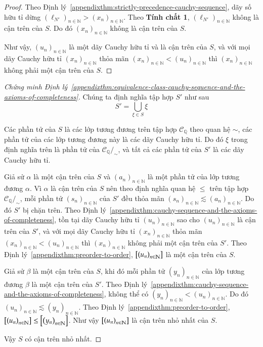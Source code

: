 \begin{proof}
    Theo Định lý~\ref{appendixthm:strictly-precedence-cauchy-sequence}, dãy số hữu tỉ dừng ${(\ell_{N'})}_{n\in\mathbb{N}} > {(x_{n})}_{n\in\mathbb{N}}$. Theo \textbf{Tính chất 1}, ${(\ell_{N'})}_{n\in\mathbb{N}}$ không là cận trên của $S$. Do đó ${(x_{n})}_{n\in\mathbb{N}}$ không là cận trên của $S$.

    Như vậy, ${(u_{n})}_{n\in\mathbb{N}}$ là một dãy Cauchy hữu tỉ và là cận trên của $S$, và với mọi dãy Cauchy hữu tỉ ${(x_{n})}_{n\in\mathbb{N}}$ thỏa mãn ${(x_{n})}_{n\in\mathbb{N}} < {(u_{n})}_{n\in\mathbb{N}}$ thì ${(x_{n})}_{n\in\mathbb{N}}$ không phải một cận trên của $S$.
\end{proof}

\begin{proof}[Chứng minh Định lý~\ref{appendixthm:equivalence-class-cauchy-sequence-and-the-axioms-of-completeness}]
    Chúng ta định nghĩa tập hợp $S'$ như sau
    \[
        S' = \bigcup_{\xi\in S} \xi
    \]

    Các phần tử của $S$ là các lớp tương đương trên tập hợp $\mathscr{C}_{\mathbb{Q}}$ theo quan hệ $\sim$, các phần tử của các lớp tương đương này là các dãy Cauchy hữu tỉ. Do đó $\xi$ trong định nghĩa trên là phần tử của $\mathscr{C}_{\mathbb{Q}}/_{\sim}$, và tất cả các phần tử của $S'$ là các dãy Cauchy hữu tỉ.

    Giả sử $\alpha$ là một cận trên của $S$ và ${(a_{n})}_{n\in\mathbb{N}}$ là một phần tử của lớp tương đương $\alpha$. Vì $\alpha$ là cận trên của $S$ nên theo định nghĩa quan hệ $\leq$ trên tập hợp $\mathscr{C}_{\mathbb{Q}}/_{\sim}$, mỗi phần tử ${(s_{n})}_{n\in\mathbb{N}}$ của $S'$ đều thỏa mãn ${(s_{n})}_{n\in\mathbb{N}}\lesssim {(a_{n})}_{n\in\mathbb{N}}$. Do đó $S'$ bị chặn trên. Theo Định lý~\ref{appendixthm:cauchy-sequence-and-the-axioms-of-completeness}, tồn tại dãy Cauchy hữu tỉ ${(u_{n})}_{n\in\mathbb{N}}$ sao cho ${(u_{n})}_{n\in\mathbb{N}}$ là cận trên của $S'$, và với mọi dãy Cauchy hữu tỉ ${(x_{n})}_{n\in\mathbb{N}}$ thỏa mãn ${(x_{n})}_{n\in\mathbb{N}} < {(u_{n})}_{n\in\mathbb{N}}$ thì ${(x_{n})}_{n\in\mathbb{N}}$ không phải một cận trên của $S'$. Theo Định lý~\ref{appendixthm:preorder-to-order}, $\left[{\left({u_{n}}\right)}_{{n}\in\mathbb{N}}\right]$ là một cận trên của $S$.

    Giả sử $\beta$ là một cận trên của $S$, khi đó mỗi phần tử ${(y_{n})}_{n\in\mathbb{N}}$ của lớp tương đương $\beta$ là một cận trên của $S'$. Theo Định lý~\ref{appendixthm:cauchy-sequence-and-the-axioms-of-completeness}, không thể có ${(y_{n})}_{n\in\mathbb{N}} < {(u_{n})}_{n\in\mathbb{N}}$. Do đó ${(u_{n})}_{n\in\mathbb{N}}\lesssim {(y_{n})}_{n\in\mathbb{N}}$.  Theo Định lý~\ref{appendixthm:preorder-to-order}, $\left[{\left({u_{n}}\right)}_{{n}\in\mathbb{N}}\right]\leq \left[{\left({y_{n}}\right)}_{{n}\in\mathbb{N}}\right]$. Như vậy $\left[{\left({u_{n}}\right)}_{{n}\in\mathbb{N}}\right]$ là cận trên nhỏ nhất của $S$.

    Vậy $S$ có cận trên nhỏ nhất.
\end{proof}

